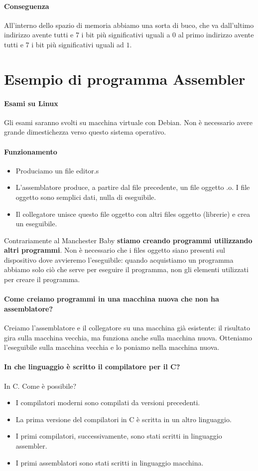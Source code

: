 \paragraph{Conseguenza} All'interno dello spazio di memoria abbiamo una sorta di buco, che va dall'ultimo indirizzo avente tutti e 7 i bit più significativi uguali a $0$ al primo indirizzo avente tutti e 7 i bit più significativi uguali ad $1$.

\section{Esempio di programma Assembler}
\paragraph{Esami su Linux} Gli esami saranno svolti su macchina virtuale con Debian. Non è necessario avere grande dimestichezza verso questo sistema operativo.
\paragraph{Funzionamento}
\begin{itemize}
	\item Produciamo un file editor.s
	\item L'assemblatore produce, a partire dal file precedente, un file oggetto .o. I file oggetto sono semplici dati, nulla di eseguibile. 
	\item Il collegatore unisce questo file oggetto con altri files oggetto (librerie) e crea un eseguibile. 
\end{itemize}
Contrariamente al Manchester Baby \textbf{stiamo creando programmi utilizzando altri programmi}. Non è necessario che i files oggetto siano presenti sul dispositivo dove avvieremo l'eseguibile: quando acquistiamo un programma abbiamo solo ciò che serve per eseguire il programma, non gli elementi utilizzati per creare il programma.
\paragraph{Come creiamo programmi in una macchina nuova che non ha assemblatore?} Creiamo l'assemblatore e il collegatore su una macchina già esistente: il risultato gira sulla macchina vecchia, ma funziona anche sulla macchina nuova. Otteniamo l'eseguibile sulla macchina vecchia e lo poniamo nella macchina nuova. 
\paragraph{In che linguaggio è scritto il compilatore per il C?} In C. Come è possibile? 
\begin{itemize}
	\item I compilatori moderni sono compilati da versioni precedenti.
	\item La prima versione del compilatori in C è scritta in un altro linguaggio.
	\item I primi compilatori, successivamente, sono stati scritti in linguaggio assembler.
	\item I primi assemblatori sono stati scritti in linguaggio macchina.
\end{itemize}
